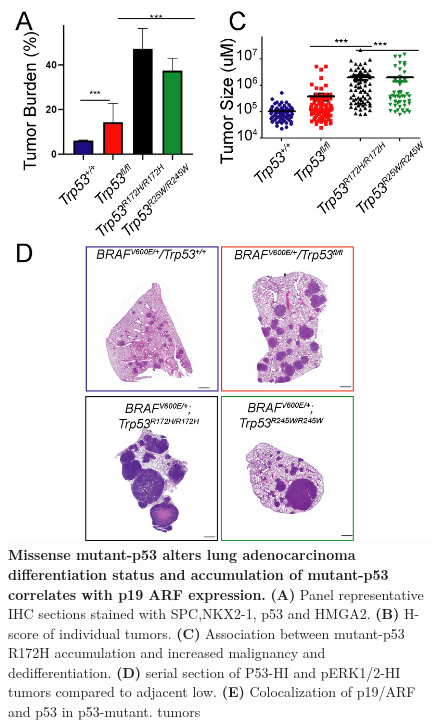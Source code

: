 \begin{figure}
\hypertarget{fig:12}{%
\centering
\includegraphics[width=1\textwidth,height=\textheight]{images/p53_2.png}
\caption{\textbf{Missense mutant-p53 alters lung adenocarcinoma differentiation status and accumulation of mutant-p53 correlates with p19 ARF expression.} \textbf{(A)} Panel representative IHC sections stained with SPC,NKX2-1, p53 and HMGA2. \textbf{(B)} H-score of individual tumors. \textbf{(C)} Association between mutant-p53 R172H accumulation and increased malignancy and dedifferentiation. \textbf{(D)} serial section of P53-HI and pERK1/2-HI tumors compared to adjacent low. \textbf{(E)} Colocalization of p19/ARF and p53 in p53-mutant. tumors}\label{fig:12}
}
\end{figure}


